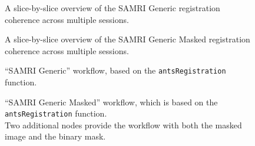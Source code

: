 \begin{figure*}[h!]
    \centering
    \begin{subfigure}[t]{1\textwidth}
        \centering
        \setlength{\fboxsep}{0pt}%
        \setlength{\fboxrule}{0.2pt}%
        \caption{A slice-by-slice overview of the SAMRI Generic registration coherence across multiple sessions.}
    \end{subfigure}
\end{figure*}
\begin{figure*}[h!]
    \ContinuedFloat
    \begin{subfigure}[t]{1\textwidth}
        \centering
        \setlength{\fboxsep}{0pt}%
        \setlength{\fboxrule}{0.2pt}%
        \caption{A slice-by-slice overview of the SAMRI Generic Masked registration coherence across multiple sessions.}
    \end{subfigure}
    \caption{
    \textbf{Both the SAMRI Generic and the Generic Masked workflow present a consistent mapping across sessions.}
    }
    \label{fig:coherence}
\end{figure*}

\begin{figure*}[h!]
    \begin{subfigure}{0.75\textwidth}
        \centering
        \vspace{-1.9em}
        \caption{
        “SAMRI Generic” workflow, based on the \textcolor{mg}{\texttt{antsRegistration}} function.
        }
        \label{fig:nwfgg}
    \end{subfigure}
    \begin{subfigure}{0.75\linewidth}
        \centering
        \vspace{-1.9em}
        \caption{
        “SAMRI Generic Masked” workflow, which is based on the \textcolor{mg}{\texttt{antsRegistration}} function.\\
        Two additional nodes provide the workflow with both the masked image and the binary mask.
        }
        \label{fig:nwfgl}
    \end{subfigure}\hfill
    \caption{
    Directed acyclic graphs visualising the two registration workflows.
    Each node name is depicted together with its corresponding package name in paranthesis.
    The “utility” indication corresponds to nodes based on Python functions specific to the workflow, distributed alongside it, and dynamically wrapped via Nipype.
    }
    \label{fig:nwfg}
\end{figure*}

